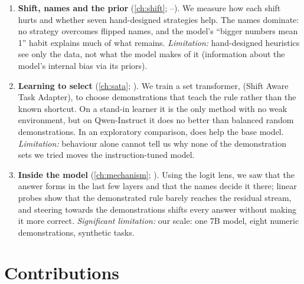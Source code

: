 \begin{enumerate}[leftmargin=2em]
  \item \textbf{Shift, names and the prior} (\autoref{ch:shift}; --).
        We measure how each shift hurts and whether seven hand-designed strategies help.
        The names dominate: no strategy overcomes flipped names, and the model's ``bigger numbers mean 1'' habit explains much of what remains.
        \emph{Limitation:} hand-designed heuristics see only the data, not what the model makes of it (information about the model's internal bias via its priors).
  \item \textbf{Learning to select} (\autoref{ch:sata}; ).
        We train a set transformer, \sata (Shift Aware Task Adapter), to choose demonstrations that teach the rule rather than the known shortcut.
        On a stand-in learner it is the only method with no weak environment, but on Qwen-Instruct it does no better than balanced random demonstrations. In an exploratory comparison, \sata does help the base model.
        \emph{Limitation:} behaviour alone cannot tell us why none of the demonstration sets we tried moves the instruction-tuned model.

  \item \textbf{Inside the model} (\autoref{ch:mechanism}; ).
        Using the logit lens, we saw that the answer forms in the last few layers and that the names decide it there; linear probes show that the demonstrated rule barely reaches the residual stream, and steering towards the demonstrations shifts every answer without making it more correct.
        \emph{Significant limitation:} our scale: one 7B model, eight numeric demonstrations, synthetic tasks.
\end{enumerate}

\section{Contributions}

